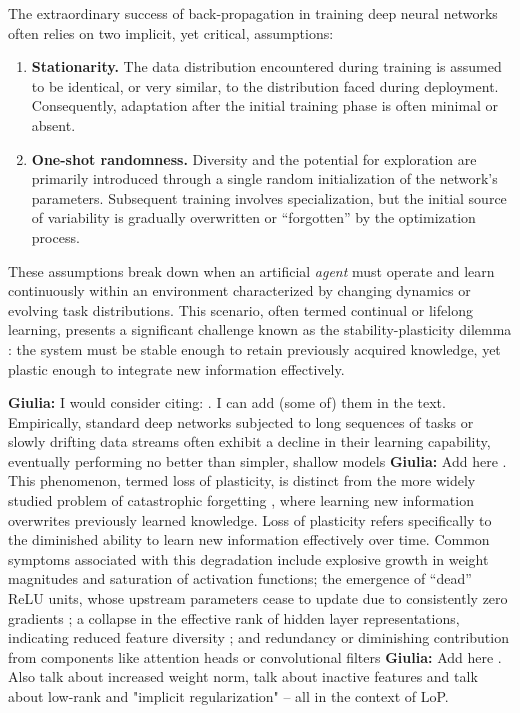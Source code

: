 \documentclass{article}
\newcommand{\giulia}[1]{{\color{ForestGreen}\textbf{Giulia:} #1}}
\begin{document}
The extraordinary success of back-propagation in training deep neural networks often relies on two implicit, yet critical, assumptions:
\begin{enumerate}
    \item \textbf{Stationarity.} The data distribution encountered during training is assumed to be identical, or very similar, to the distribution faced during deployment. Consequently, adaptation after the initial training phase is often minimal or absent.
    \item \textbf{One-shot randomness.} Diversity and the potential for exploration are primarily introduced through a single random initialization of the network's parameters. Subsequent training involves specialization, but the initial source of variability is gradually overwritten or ``forgotten'' by the optimization process.
\end{enumerate}
These assumptions break down when an artificial \emph{agent} must operate and learn continuously within an environment characterized by changing dynamics or evolving task distributions. This scenario, often termed continual or lifelong learning, presents a significant challenge known as the stability-plasticity dilemma \cite{abraham2005memory}: the system must be stable enough to retain previously acquired knowledge, yet plastic enough to integrate new information effectively.

\giulia{I would consider citing: \citep{berariu2021plasticity,lyle2023understanding,kumar2024regenerative,dohare2023maintaining,sokar2023dormant,chaudhry2018riemannian,ash2020warmstarting,nikishin2022primacy,dohare2021continual}. I can add (some of) them in the text.\newline}
Empirically, standard deep networks subjected to long sequences of tasks or slowly drifting data streams often exhibit a decline in their learning capability, eventually performing no better than simpler, shallow models \cite{dohare2024loss}\giulia{Add here \citep{berariu2021plasticity,dohare2021continual,nikishin2022primacy}}. This phenomenon, termed loss of plasticity, is distinct from the more widely studied problem of catastrophic forgetting \cite{mccloskey1989catastrophic, ratcliff1990connectionist, french1999catastrophic}, where learning new information overwrites previously learned knowledge. Loss of plasticity refers specifically to the diminished ability to learn new information effectively over time. Common symptoms associated with this degradation include explosive growth in weight magnitudes and saturation of activation functions; the emergence of ``dead'' ReLU units, whose upstream parameters cease to update due to consistently zero gradients \cite{nair2010rectified}; a collapse in the effective rank of hidden layer representations, indicating reduced feature diversity \cite{papyan2020prevalence, huh2022lowrank}; and redundancy or diminishing contribution from components like attention heads or convolutional filters \giulia{Add here \citep{lyle2023understanding}. Also \citep{nikishin2022primacy} talk about increased weight norm, \citep{dohare2021continual, lyle2022understanding} talk about inactive features and \citep{kumar2020implicit,gulcehre2022empirical} talk about low-rank and "implicit regularization" -- all in the context of LoP}.
\end{document}
